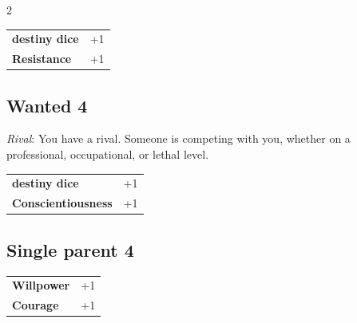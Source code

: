\begin{multicols}{2}
\begin{tcolorbox}
\begin{tabular}{@{}ll@{}}
    \textbf{destiny dice} & +1\\
    \textbf{Resistance} & +1\\
\end{tabular}


\end{tcolorbox}

\begin{tcolorbox}
    \subsection*{Wanted \hfill \small{4 }}
    \tcblower
\textit{Rival}: You have a rival. Someone is competing with you, whether on a professional, occupational, or lethal level.


\vspace{3mm}

\begin{tabular}{@{}ll@{}}
    \textbf{destiny dice} & +1\\
    \textbf{Conscientiousness} & +1\\
\end{tabular}


\end{tcolorbox}

\begin{tcolorbox}
    \subsection*{Single parent \hfill \small{4 }}
    \tcblower




\begin{tabular}{@{}ll@{}}
    \textbf{Willpower} & +1\\
    \textbf{Courage} & +1\\
\end{tabular}



\end{tcolorbox}
\end{multicols}
